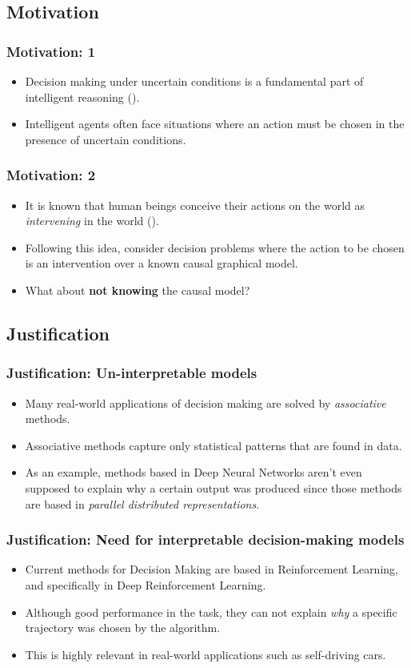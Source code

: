 \documentclass{beamer}
\theoremstyle{plain}
\begin{document}
	\subsection{Motivation}
	\begin{frame}
	\frametitle{Motivation: 1}
	\begin{itemize}
	\item Decision making under uncertain conditions is a fundamental part of intelligent reasoning (\cite{lake2017building}).
	\item Intelligent agents often face situations where an action must be chosen in the presence of uncertain conditions.
	\end{itemize}
	\end{frame}
	\begin{frame}
	\frametitle{Motivation: 2}
	\begin{itemize}
	\item It is known that human beings conceive their actions on the world as \textit{intervening} in the world (\cite{hagmayer2009decision}).
	\item Following this idea, \cite{lattimoreNIPS2016} consider decision problems where the action to be chosen is an intervention over a known causal graphical model.
	\item What about \textbf{not knowing} the causal model? 
	\end{itemize}
	\end{frame}
	
	\subsection{Justification}
	\begin{frame}
	\frametitle{Justification: Un-interpretable models}
	\begin{itemize}
	\item Many real-world applications of decision making are solved by \textit{associative} methods.
	\item Associative methods capture only statistical patterns that are found in data.
	\item As an example, methods based in Deep Neural Networks aren't even supposed to explain why a certain output was produced since those methods are based in \textit{parallel distributed representations}.
	\end{itemize}
	\end{frame}
	
	\begin{frame}
	\frametitle{Justification: Need for interpretable decision-making models}
	\begin{itemize}
	\item Current methods for Decision Making are based in Reinforcement Learning, and specifically in Deep Reinforcement Learning. 
	\item Although good performance in the task, they can not explain \textit{why} a specific trajectory was chosen by the algorithm.
	\item This is highly relevant in real-world applications such as self-driving cars.
	\end{itemize}
	\end{frame}
	
\end{document}
